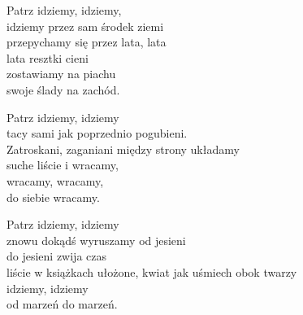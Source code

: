 \begin{text}
    Patrz idziemy, idziemy,\\
    idziemy przez sam środek ziemi\\
    przepychamy się przez lata, lata\\
    lata resztki cieni\\
    zostawiamy na piachu\\
    swoje ślady na zachód.

    Patrz idziemy, idziemy\\
    tacy sami jak poprzednio pogubieni.\\
    Zatroskani, zaganiani między strony układamy\\
    suche liście i wracamy,\\
    wracamy, wracamy,\\
    do siebie wracamy.

    Patrz idziemy, idziemy\\
    znowu dokądś wyruszamy od jesieni\\
    do jesieni zwija czas\\
    liście w książkach ułożone, kwiat jak uśmiech obok twarzy\\
    idziemy, idziemy\\
    od marzeń do marzeń.
\end{text}
\begin{chord}

\end{chord}